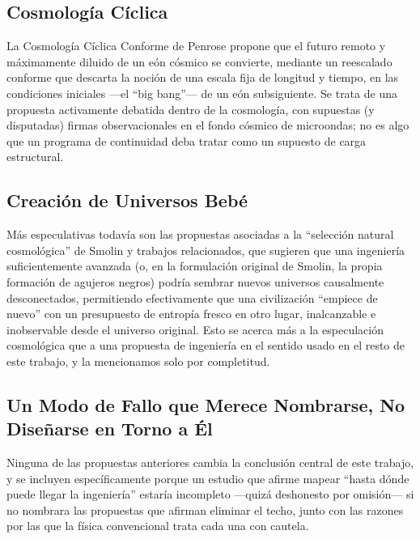 \documentclass[11pt]{article}
\begin{document}
\subsection{Cosmología Cíclica}

La Cosmología Cíclica Conforme de Penrose \citep{penrose2010cycles} propone que el futuro remoto y máximamente diluido de un eón cósmico se convierte, mediante un reescalado conforme que descarta la noción de una escala fija de longitud y tiempo, en las condiciones iniciales —el ``big bang''— de un eón subsiguiente. Se trata de una propuesta activamente debatida dentro de la cosmología, con supuestas (y disputadas) firmas observacionales en el fondo cósmico de microondas; no es algo que un programa de continuidad deba tratar como un supuesto de carga estructural.

\subsection{Creación de Universos Bebé}

Más especulativas todavía son las propuestas asociadas a la ``selección natural cosmológica'' de Smolin y trabajos relacionados, que sugieren que una ingeniería suficientemente avanzada (o, en la formulación original de Smolin, la propia formación de agujeros negros) podría sembrar nuevos universos causalmente desconectados, permitiendo efectivamente que una civilización ``empiece de nuevo'' con un presupuesto de entropía fresco en otro lugar, inalcanzable e inobservable desde el universo original. Esto se acerca más a la especulación cosmológica que a una propuesta de ingeniería en el sentido usado en el resto de este trabajo, y la mencionamos solo por completitud.

\subsection{Un Modo de Fallo que Merece Nombrarse, No Diseñarse en Torno a Él}

Ninguna de las propuestas anteriores cambia la conclusión central de este trabajo, y se incluyen específicamente porque un estudio que afirme mapear ``hasta dónde puede llegar la ingeniería'' estaría incompleto —quizá deshonesto por omisión— si no nombrara las propuestas que afirman eliminar el techo, junto con las razones por las que la física convencional trata cada una con cautela.
\end{document}

